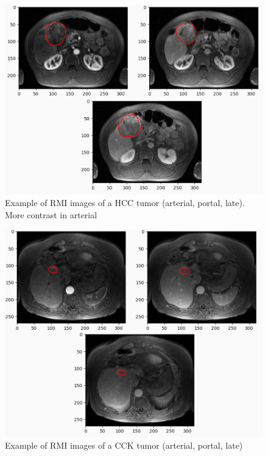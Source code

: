 \documentclass{beamer}
\begin{document}
\begin{frame}
    \begin{figure}
        \centering
        \includegraphics[scale = 0.215]{images/HCC.png}
        \caption{Example of RMI images of a HCC tumor (arterial, portal, late). More contrast in arterial}
    \end{figure}
\end{frame}

\begin{frame}
    \begin{figure}
        \centering
        \includegraphics[scale = 0.215]{images/CCK.png}
        \caption{Example of RMI images of a CCK tumor (arterial, portal, late)}
    \end{figure}
\end{frame}
\end{document}
